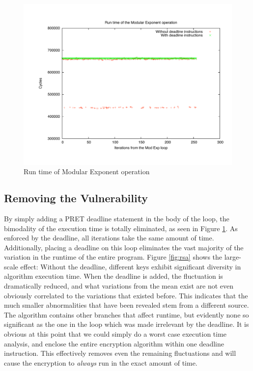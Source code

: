 \documentclass[times, 10pt,twocolumn]{article}
\begin{document}
\begin{figure}[ht]
  \centering
  \includegraphics[scale=.3]{./images/ModExp.pdf}
  \caption{Run time of Modular Exponent operation}
  \label{fig:modexp}
\end{figure}

\subsection{Removing the Vulnerability}
By simply adding a PRET deadline statement in the body of the loop, the bimodality of the execution time is totally eliminated, as seen in Figure \ref{fig:modexp}.  As enforced by the deadline, all iterations take the same amount of time.  Additionally, placing a deadline on this loop eliminates the vast majority of the variation in the runtime of the entire program.  Figure \ref{fig:rsa} shows the large-scale effect:  Without the deadline, different keys exhibit significant diversity in algorithm execution time.  When the deadline is added, the fluctuation is dramatically reduced, and what variations from the mean exist are not even obviously correlated to the variations that existed before.  This indicates that the much smaller abnormalities that have been revealed stem from a different source.  The algorithm contains other branches that affect runtime, but evidently none so significant as the one in the loop which was made irrelevant by the deadline. It is obvious at this point that we could simply do a worst case execution time analysis, and enclose the entire encryption algorithm within one deadline instruction. This effectively removes even the remaining fluctuations and will cause the encryption to \emph{always} run in the exact amount of time.
\end{document}
